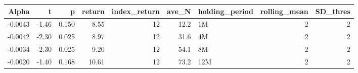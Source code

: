 \begin{table}[ht]
\centering
\begin{tabular}{rrrrrrlrr}
  \hline
Alpha & t & p & return & index\_return & ave\_N & holding\_period & rolling\_mean & SD\_thres \\ 
  \hline
-0.0043 & -1.46 & 0.150 & 8.55 & 12 & 12.2 & 1M &  2 &  2 \\ 
  -0.0042 & -2.30 & 0.025 & 8.97 & 12 & 31.6 & 4M &  2 &  2 \\ 
  -0.0034 & -2.30 & 0.025 & 9.20 & 12 & 54.1 & 8M &  2 &  2 \\ 
  -0.0020 & -1.40 & 0.168 & 10.61 & 12 & 73.2 & 12M &  2 &  2 \\ 
   \hline
\end{tabular}
\end{table}

